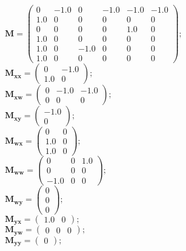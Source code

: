 \documentclass[11pt, oneside]{article}      %
\begin{document}
%
$ \mathbf{M} = \left(\begin{array}{cccccc}0 & -1.0 & 0 & -1.0 & -1.0 & -1.0\\1.0 & 0 & 0 & 0 & 0 & 0\\0 & 0 & 0 & 0 & 1.0 & 0\\1.0 & 0 & 0 & 0 & 0 & 0\\1.0 & 0 & -1.0 & 0 & 0 & 0\\1.0 & 0 & 0 & 0 & 0 & 0\end{array}\right) ; $ 
%
\\
%
$ \mathbf{M_{xx}} = \left(\begin{array}{cc}0 & -1.0\\1.0 & 0\end{array}\right) ; $ 
%
\\
%
$ \mathbf{M_{xw}} = \left(\begin{array}{ccc}0 & -1.0 & -1.0\\0 & 0 & 0\end{array}\right) ; $ 
%
\\
%
$ \mathbf{M_{xy}} = \left(\begin{array}{c}-1.0\\0\end{array}\right) ; $ 
%
\\
%
$ \mathbf{M_{wx}} = \left(\begin{array}{cc}0 & 0\\1.0 & 0\\1.0 & 0\end{array}\right) ; $ 
%
\\
%
$ \mathbf{M_{ww}} = \left(\begin{array}{ccc}0 & 0 & 1.0\\0 & 0 & 0\\-1.0 & 0 & 0\end{array}\right) ; $ 
%
\\
%
$ \mathbf{M_{wy}} = \left(\begin{array}{c}0\\0\\0\end{array}\right) ; $ 
%
\\
%
$ \mathbf{M_{yx}} = \left(\begin{array}{cc}1.0 & 0\end{array}\right) ; $ 
%
\\
%
$ \mathbf{M_{yw}} = \left(\begin{array}{ccc}0 & 0 & 0\end{array}\right) ; $ 
%
\\
%
$ \mathbf{M_{yy}} = \left(\begin{array}{c}0\end{array}\right) ; $ 
%
\\
%
\end{document}
